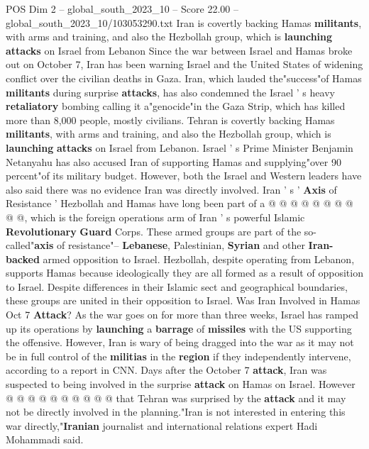 \begin{textsample}{POS Dim 2 – global\_south\_2023\_10 – Score 22.00 – global\_south\_2023\_10/103053290.txt}  \label{ex:f2_pos_057}
Iran is covertly backing Hamas \textbf{militants}, with arms and training, and also the Hezbollah group, which is \textbf{launching} \textbf{attacks} on Israel from Lebanon Since the war between Israel and Hamas broke out on October 7, Iran has been warning Israel and the United States of widening conflict over the civilian deaths in Gaza.
Iran, which lauded the"success"of Hamas \textbf{militants} during surprise \textbf{attacks}, has also condemned the Israel ' s heavy \textbf{retaliatory} bombing calling it a"genocide"in the Gaza Strip, which has killed more than 8,000 people, mostly civilians.
Tehran is covertly backing Hamas \textbf{militants}, with arms and training, and also the Hezbollah group, which is \textbf{launching} \textbf{attacks} on Israel from Lebanon.
Israel ' s Prime Minister Benjamin Netanyahu has also accused Iran of supporting Hamas and supplying"over 90 percent"of its military budget.
However, both the Israel and Western leaders have also said there was no evidence Iran was directly involved.
Iran ' s ' \textbf{Axis} of Resistance ' Hezbollah and Hamas have long been part of a @ @ @ @ @ @ @ @ @ @, which is the foreign operations arm of Iran ' s powerful Islamic \textbf{Revolutionary} \textbf{Guard} Corps.
These armed groups are part of the so-called"\textbf{axis} of resistance"-- \textbf{Lebanese}, Palestinian, \textbf{Syrian} and other \textbf{Iran-backed} armed opposition to Israel.
Hezbollah, despite operating from Lebanon, supports Hamas because ideologically they are all formed as a result of opposition to Israel.
Despite differences in their Islamic sect and geographical boundaries, these groups are united in their opposition to Israel.
Was Iran Involved in Hamas Oct 7 \textbf{Attack}?
As the war goes on for more than three weeks, Israel has ramped up its operations by \textbf{launching} a \textbf{barrage} of \textbf{missiles} with the US supporting the offensive.
However, Iran is wary of being dragged into the war as it may not be in full control of the \textbf{militias} in the \textbf{region} if they independently intervene, according to a report in CNN.
Days after the October 7 \textbf{attack}, Iran was suspected to being involved in the surprise \textbf{attack} on Hamas on Israel.
However @ @ @ @ @ @ @ @ @ @ that Tehran was surprised by the \textbf{attack} and it may not be directly involved in the planning."Iran is not interested in entering this war directly,"\textbf{Iranian} journalist and international relations expert Hadi Mohammadi said.

\end{textsample}
